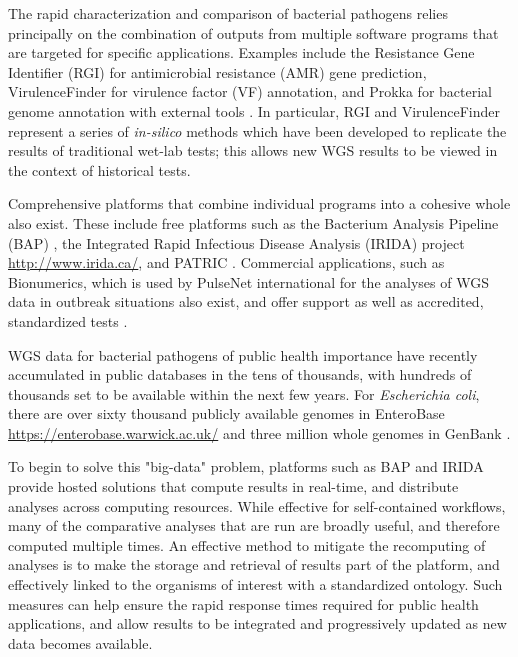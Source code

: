 \documentclass[a4,center,fleqn]{NAR}
\begin{document}
The rapid characterization and comparison of bacterial pathogens relies principally on the combination of outputs from multiple software programs that are targeted for specific applications. Examples include the Resistance Gene Identifier (RGI) \citep{mcarthur2013comprehensive} for antimicrobial resistance (AMR) gene prediction, VirulenceFinder \citep{kleinheinz2014applying} for virulence factor (VF) annotation, and Prokka for bacterial genome annotation with external tools \citep{doi:10.1093/bioinformatics/btu153}. In particular, RGI and VirulenceFinder represent a series of \textit{in-silico} methods which have been developed to replicate the results of traditional wet-lab tests; this allows new WGS results to be viewed in the context of historical tests.

Comprehensive platforms that combine individual programs into a cohesive whole also exist. These include free platforms such as the Bacterium Analysis Pipeline (BAP) \citep{thomsen2016bacterial}, the Integrated Rapid Infectious Disease Analysis (IRIDA) project \url{http://www.irida.ca/}, and PATRIC \citep{wattam2013patric}. Commercial applications, such as Bionumerics, which is used by PulseNet international for the analyses of WGS data in outbreak situations also exist, and offer support as well as accredited, standardized tests \citep{swaminathan2001pulsenet}.

WGS data for bacterial pathogens of public health importance have recently accumulated in public databases in the tens of thousands, with hundreds of thousands set to be available within the next few years. For \textit{Escherichia coli}, there are over sixty thousand publicly available genomes in EnteroBase \url{https://enterobase.warwick.ac.uk/} and three million whole genomes in GenBank \citep{doi:10.1093/nar/gks1195}.

To begin to solve this "big-data" problem, platforms such as BAP and IRIDA provide hosted solutions that compute results in real-time, and distribute analyses across computing resources. While effective for self-contained workflows, many of the comparative analyses that are run are broadly useful, and therefore computed multiple times. An effective method to mitigate the recomputing of analyses is to make the storage and retrieval of results part of the platform, and effectively linked to the organisms of interest with a standardized ontology. Such measures can help ensure the rapid response times required for public health applications, and allow results to be integrated and progressively updated as new data becomes available.
\end{document}
